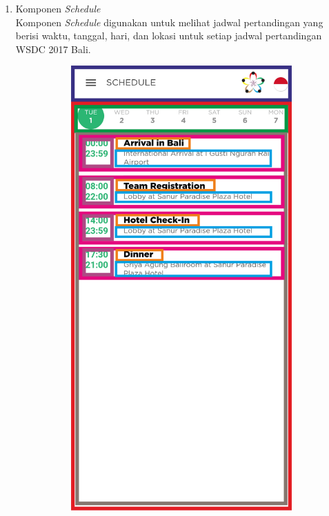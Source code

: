 \begin{enumerate}
	\item Komponen \textit{Schedule} \\
	Komponen \textit{Schedule} digunakan untuk melihat jadwal pertandingan yang berisi waktu, tanggal, hari, dan lokasi untuk setiap jadwal pertandingan WSDC 2017 Bali.
	\begin{figure}[H]
    	\centering
     	\begin{subfigure}[b]{0.43\textwidth}
        	\centering
         	\includegraphics[scale=0.465]{Gambar/SchedulePageWireframe.png}

\end{subfigure}
\end{figure}
\end{enumerate}
